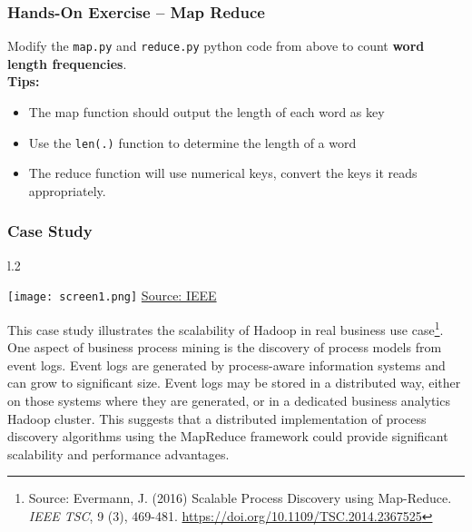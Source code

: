 \begin{tcolorbox}[colback=code]

\subsubsection*{Hands-On Exercise -- Map Reduce}

Modify the \texttt{map.py} and \texttt{reduce.py} python code from above to count \textbf{word length frequencies}. \\

\vspace{\baselineskip}
\textbf{Tips:}
\begin{itemize}
   \item The map function should output the length of each word as key
   \item Use the \texttt{len(.)} function to determine the length of a word
   
   \item The reduce function will use numerical keys, convert the keys it reads appropriately.
\end{itemize}
\end{tcolorbox}

\newpage
\subsubsection*{Case Study}

\begin{wrapfigure}{l}{.2\textwidth}
\begin{center}
\texttt{[image: screen1.png]}
\scriptsize \url{Source: IEEE}
\end{center}
\end{wrapfigure}
This case study illustrates the scalability of Hadoop in real business use case\footnote{Source: Evermann, J. (2016) Scalable Process Discovery using Map-Reduce. \emph{IEEE TSC}, 9 (3), 469-481. \url{https://doi.org/10.1109/TSC.2014.2367525}}. One aspect of business process mining is the discovery of process models from event logs. Event logs are generated by process-aware information systems and can grow to significant size. Event logs may be stored in a distributed way, either on those systems where they are generated, or in a dedicated business analytics Hadoop cluster. This suggests that a distributed implementation of process discovery algorithms using the MapReduce framework could provide significant scalability and performance advantages. 

